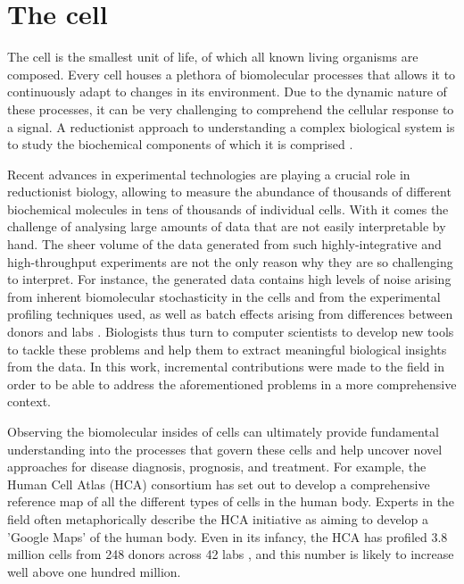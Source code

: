 
\section{The cell}
The cell is the smallest unit of life, of which all known living organisms are composed. Every cell houses a plethora of biomolecular processes that allows it to continuously adapt to changes in its environment. Due to the dynamic nature of these processes, it can be very challenging to comprehend the cellular response to a signal. A reductionist approach to understanding a complex biological system is to study the biochemical components of which it is comprised \cite{brigandt_reductionismbiology_2017}.

Recent advances in experimental technologies are playing a crucial role in reductionist biology, allowing to measure the abundance of thousands of different biochemical molecules in tens of thousands of individual cells. With it comes the challenge of analysing large amounts of data that are not easily interpretable by hand. The sheer volume of the data generated from such highly-integrative and high-throughput experiments are not the only reason why they are so challenging to interpret. For instance, the generated data contains high levels of noise arising from inherent biomolecular stochasticity in the cells and from the experimental profiling techniques used, as well as batch effects arising from differences between donors and labs \cite{hon_humancellatlas_2018}. Biologists thus turn to computer scientists
to develop new tools to tackle these problems and help them to extract meaningful biological insights from the data. In this work, incremental contributions were made to the field in order to be able to address the aforementioned problems in a more comprehensive context.

Observing the biomolecular insides of cells can ultimately provide fundamental understanding into the processes that govern these cells and help uncover novel approaches for disease diagnosis, prognosis, and treatment. For example, the Human Cell Atlas (HCA) consortium \cite{regev_humancellatlas_2018} has set out to develop a comprehensive reference map of all the different types of cells in the human body. Experts in the field often metaphorically describe the HCA initiative as aiming to develop a 'Google Maps' of the human body. Even in its infancy, the HCA has profiled 3.8 million cells from 248 donors across 42 labs \cite{humancellatlasconsortium_humancellatlas_2018}, and this number is likely to increase well above one hundred million.

